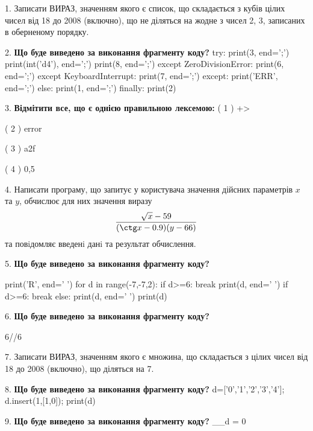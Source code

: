\documentclass[11pt]{article}
\begin{document}
1. 
Записати ВИРАЗ, значенням якого є список, що складається з кубів цілих чисел від 18 до 2008 (включно), що не діляться на жодне з чисел 2, 3, записаних в оберненому порядку.\par\vspace{5mm}
2. \textbf{Що буде виведено за виконання фрагменту коду?}
try:
    print(3, end=';')
    print(int('d4'), end=';')
    print(8, end=';')
except ZeroDivisionError:
    print(6, end=';')
except KeyboardInterrupt:
    print(7, end=';')
except:
    print('ERR', end=';')
else:
    print(1, end=';')
finally:
    print(2)
\par\vspace{5mm}
3. %
\textbf{Відмітити все, що є однією правильною лексемою:}
( 1 ) +>

( 2 ) error

( 3 ) a2f

( 4 ) 0,5
\par\vspace{5mm}
4. 
Написати програму, що запитує у користувача значення дійсних параметрів $x$ та $y$, обчислює для них значення виразу 
$$\frac{\sqrt x - 59}{(\ctg x - 0.9) (y - 66)}$$ 
та повiдомляє введенi данi та результат обчислення.

\par\vspace{5mm}
5. \textbf{Що буде виведено за виконання фрагменту коду?}

print('R', end=' ')
for d in range(-7,-7,2):
    if d>=6:
        break
        print(d, end=' ')
    if d>=6:
        break
    else:
        print(d, end=' ')
    print(d)
\par\vspace{5mm}
6. \textbf{Що буде виведено за виконання фрагменту коду?}

6//6%
\par\vspace{5mm}
7. 
Записати ВИРАЗ, значенням якого є множина, що складається з цілих чисел від 18 до 2008 (включно), що діляться на 7.\par\vspace{5mm}
8. \textbf{Що буде виведено за виконання фрагменту коду?}
d=['0','1','2','3','4']; d.insert(1,[1,0]); print(d)\par\vspace{5mm}
9. \textbf{Що буде виведено за виконання фрагменту коду?}
__d = 0
\end{document}
